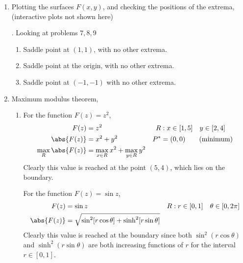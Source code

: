 \begin{enumerate}
    \item Plotting the surfaces $ F(x, y) $, and checking the positions of the
          extrema, (interactive plots not shown here) \par.
          Looking at problems $ 7,8,9 $
          \begin{enumerate}
              \item Saddle point at $ (1,1) $, with no other extrema.
              \item Saddle point at the origin, with no other extrema.
              \item Saddle point at $ (-1,-1) $ with no other extrema.
          \end{enumerate}

    \item Maximum modulus theorem,
          \begin{enumerate}
              \item For the function $ F(z) = z^2 $,
                    \begin{align}
                        F(z)               & = z^2                            &
                        R                  & : x \in [1,5] \quad y \in [2,4]    \\
                        \abs{F(z)}         & = x^2 + y^2                      &
                        P^*                & = (0, 0) \qquad \text{(minimum)}   \\
                        \max_R{\abs{F(z)}} & = \max_{x \in R}{x^2}
                        + \max_{y \in R}{y^2}
                    \end{align}
                    Clearly this value is reached at the point $ (5, 4) $, which lies on
                    the boundary. \par
                    For the function $ F(z) = \sin z $,
                    \begin{align}
                        F(z)       & = \sin z                                &
                        R          & : r \in [0,1] \quad \theta \in [0,2\pi]   \\
                        \abs{F(z)} & = \sqrt{\sin^2[r\cos\theta]
                        + \sinh^2[r\sin\theta]}
                    \end{align}
                    Clearly this value is reached at the boundary since both
                    $ \sin^2(r\cos\theta) $ and $ \sinh^2(r\sin\theta) $ are both
                    increasing functions of $ r $ for the interval $ r \in [0,1] $.
                    \par

\end{enumerate}
\end{enumerate}
